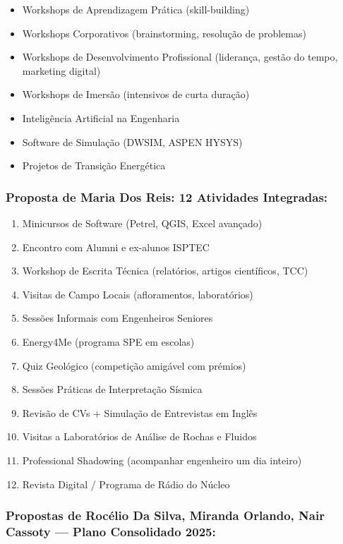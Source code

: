 \documentclass[12pt,a4paper]{article}
\begin{document}
\begin{itemize}[itemsep=0.15cm]
    \item Workshops de Aprendizagem Prática (skill-building)
    \item Workshops Corporativos (brainstorming, resolução de problemas)
    \item Workshops de Desenvolvimento Profissional (liderança, gestão do tempo, marketing digital)
    \item Workshops de Imersão (intensivos de curta duração)
    \item Inteligência Artificial na Engenharia
    \item Software de Simulação (DWSIM, ASPEN HYSYS)
    \item Projetos de Transição Energética
\end{itemize}

\subsubsection*{Proposta de Maria Dos Reis: 12 Atividades Integradas:}

\begin{enumerate}[itemsep=0.1cm]
    \item Minicursos de Software (Petrel, QGIS, Excel avançado)
    \item Encontro com Alumni e ex-alunos ISPTEC
    \item Workshop de Escrita Técnica (relatórios, artigos científicos, TCC)
    \item Visitas de Campo Locais (afloramentos, laboratórios)
    \item Sessões Informais com Engenheiros Seniores
    \item Energy4Me (programa SPE em escolas)
    \item Quiz Geológico (competição amigável com prémios)
    \item Sessões Práticas de Interpretação Sísmica
    \item Revisão de CVs + Simulação de Entrevistas em Inglês
    \item Visitas a Laboratórios de Análise de Rochas e Fluidos
    \item Professional Shadowing (acompanhar engenheiro um dia inteiro)
    \item Revista Digital / Programa de Rádio do Núcleo
\end{enumerate}

\subsubsection*{Propostas de Rocélio Da Silva, Miranda Orlando, Nair Cassoty — Plano Consolidado 2025:}
\end{document}
